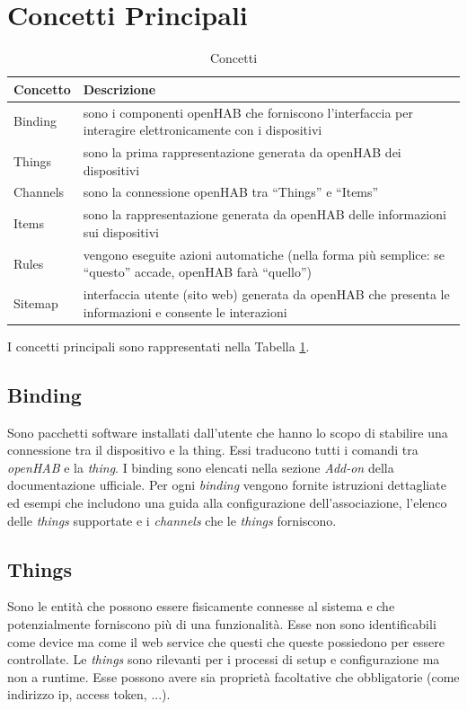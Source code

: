 \section{Concetti Principali}
\begin{table}[]
    \centering
    \begin{tabular}{ l | p{10cm} }
        \textbf{Concetto} & \textbf{Descrizione}\\
        \hline
         Binding &  sono i componenti openHAB che forniscono l'interfaccia per interagire elettronicamente con i dispositivi\\
         Things & sono la prima rappresentazione generata da openHAB dei dispositivi\\
         Channels & sono la connessione openHAB tra ``Things'' e ``Items''\\
         Items & sono la rappresentazione generata da openHAB delle informazioni sui dispositivi\\
         Rules & vengono eseguite azioni automatiche (nella forma più semplice: se ``questo'' accade, openHAB farà ``quello'')\\
         Sitemap & interfaccia utente (sito web) generata da openHAB che presenta le informazioni e consente le interazioni
    \end{tabular}
    \caption{Concetti}
    \label{tab:concetti}
\end{table}

I concetti principali sono rappresentati nella Tabella \ref{tab:concetti}.

\subsection{Binding} \label{chap:binding_intro} Sono pacchetti software installati dall'utente che hanno lo scopo di stabilire una connessione tra il dispositivo e la thing. Essi traducono tutti i comandi tra {\em openHAB} e la {\em thing}. I binding sono elencati nella sezione {\em Add-on} della documentazione ufficiale. Per ogni {\em binding} vengono fornite istruzioni dettagliate ed esempi che includono una guida alla configurazione dell'associazione, l'elenco delle {\em things} supportate e i {\em channels} che le {\em things} forniscono.

\subsection{Things} Sono le entità che possono essere fisicamente connesse al sistema e che potenzialmente forniscono più di una funzionalità. Esse non sono identificabili come device ma come il web service che questi che queste possiedono per essere controllate. Le {\em things} sono rilevanti per i processi di setup e configurazione ma non a runtime. Esse possono avere sia proprietà facoltative che obbligatorie (come indirizzo ip, access token, ...).

